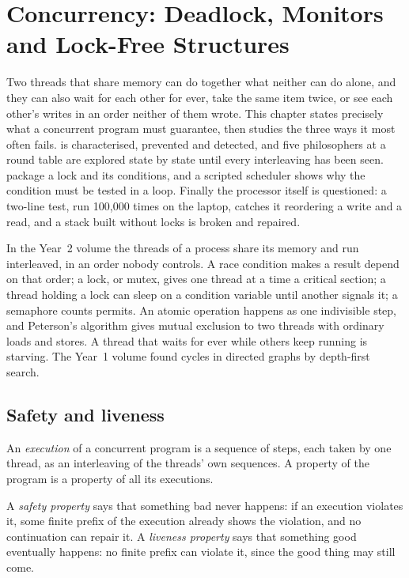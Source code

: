 \chapter{Concurrency: Deadlock, Monitors and Lock-Free Structures}\label{ch:b3:concurrency}

Two threads that share memory can do together what neither can do alone, and they can also wait for each other for ever, take the same item twice, or see each other's writes in an order neither of them wrote. This chapter states precisely what a concurrent program must guarantee, then studies the three ways it most often fails.  is characterised, prevented and detected, and five philosophers at a round table are explored state by state until every interleaving has been seen.  package a lock and its conditions, and a scripted scheduler shows why the condition must be tested in a loop. Finally the processor itself is questioned: a two-line test, run 100,000 times on the laptop, catches it reordering a write and a read, and a stack built without locks is broken and repaired.

\begin{recall}
In the Year~2 volume the threads of a process share its memory and run interleaved, in an order nobody controls. A race condition makes a result depend on that order; a lock, or mutex, gives one thread at a time a critical section; a thread holding a lock can sleep on a condition variable until another signals it; a semaphore counts permits. An atomic operation happens as one indivisible step, and Peterson's algorithm gives mutual exclusion to two threads with ordinary loads and stores. A thread that waits for ever while others keep running is starving. The Year~1 volume found cycles in directed graphs by depth-first search.
\end{recall}

\section{Safety and liveness}\label{sec:b3:concurrency:properties}

An \emph{execution} of a concurrent program is a sequence of steps, each taken by one thread, as an interleaving of the threads' own sequences. A property of the program is a property of all its executions.

\begin{definition}\label{def:b3:concurrency:properties}
A \emph{safety property} says that something bad never happens: if an execution violates it, some finite prefix of the execution already shows the violation, and no continuation can repair it. A \emph{liveness property} says that something good eventually happens: no finite prefix can violate it, since the good thing may still come.
\end{definition}

